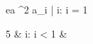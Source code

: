 \begin{eqcode}{e}{a }{^2}{}
  a_i | i: i = 1 \gets  
  \begin{cases}
    5 & i: i < 1  & \otherwise \lend %
  \end{cases} \lend
\end{eqcode}
